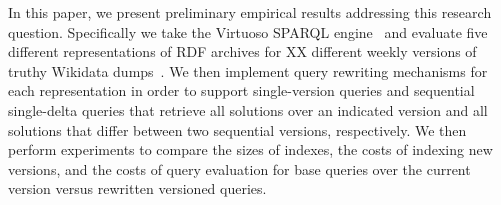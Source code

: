 \documentclass{llncs}
\begin{document}
In this paper, we present preliminary empirical results addressing this research question. Specifically we take the Virtuoso SPARQL engine~\cite{Erling12} and  evaluate five different representations of RDF archives for XX different weekly versions of truthy Wikidata dumps~\cite{VrandecicK14}. We then implement query rewriting mechanisms for each representation in order to support single-version queries and sequential single-delta queries that retrieve all solutions over an indicated version and all solutions that differ between two sequential versions, respectively. We then perform experiments to compare the sizes of indexes, the costs of indexing new versions, and the costs of query evaluation for base queries over the current version versus rewritten versioned queries.




%
%
%
%
%
%
\end{document}
